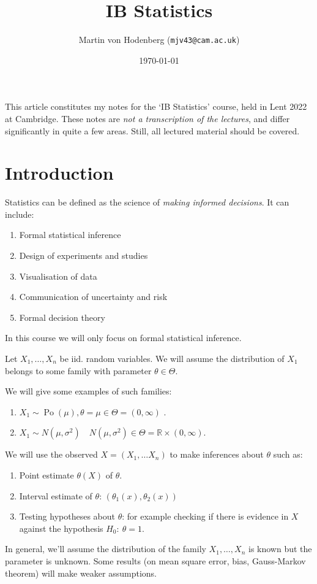 \documentclass[a4paper]{scrartcl}
\title{IB Statistics}
\author{Martin von Hodenberg (\texttt{mjv43@cam.ac.uk})}
\date{\today}
\begin{document}
\maketitle

This article constitutes my notes for the `IB Statistics' course, held in Lent 2022 at Cambridge. These notes are \emph{not a transcription of the lectures}, and differ significantly in quite a few areas. Still, all lectured material should be covered.



\tableofcontents
\newpage

\section{Introduction}
Statistics can be defined as the science of \emph{making informed decisions}. It can include:
\begin{enumerate}
    \item Formal statistical inference
    \item Design of experiments and studies
    \item Visualisation of data
    \item Communication of uncertainty and risk
    \item Formal decision theory
\end{enumerate}
In this course we will only focus on formal statistical inference.
\begin{definition}
     Let $X_1 , \ldots , X_n$ be iid. random variables. We will assume the distribution of $X_1 $ belongs to some family with parameter $\theta \in \Theta$.
\end{definition}
\begin{example}
    We will give some examples of such families:
     \begin{enumerate}
         \item $X_1 \sim \operatorname{Po}(\mu), \theta=\mu \in \Theta=(0,\infty )$ .
         \item $X_1 \sim N (\mu, \sigma^2) \quad N (\mu, \sigma^2)\in \Theta=\mathbb{R} \times (0, \infty)$.
     \end{enumerate}
\end{example}
We will use the observed $X= (X_1 , \ldots X_n)$ to make inferences about $\theta$ such as:
\begin{enumerate}
    \item Point estimate $\theta (X)$ of $\theta$.
    \item Interval estimate of $\theta$: $(\theta_1 (x),\theta_2 (x))$ 
    \item Testing hypotheses about $\theta$: for example checking if there is evidence in $X$ against the hypothesis $H_0 : \ \theta=1$.
\end{enumerate}
\begin{remark}
     In general, we'll assume the distribution of the family $X_1 , \ldots , X_n$ is known but the parameter is unknown. Some results (on mean square error, bias, Gauss-Markov theorem) will make weaker assumptions.
\end{remark}
\end{document}
